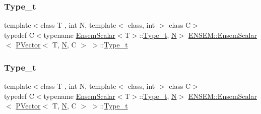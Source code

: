 \subsubsection{\texorpdfstring{Type\_t}{Type\_t}\hspace{0.1cm}{\footnotesize\ttfamily [1/3]}}
{\footnotesize\ttfamily template$<$class T , int N, template$<$ class, int $>$ class C$>$ \\
typedef C$<$typename \mbox{\hyperlink{structENSEM_1_1EnsemScalar}{Ensem\+Scalar}}$<$T$>$\+::\mbox{\hyperlink{structENSEM_1_1EnsemScalar_3_01PVector_3_01T_00_01N_00_01C_01_4_01_4_a7301e4986b6b626a7c41055ad178ffac}{Type\+\_\+t}}, \mbox{\hyperlink{adat__devel_2lib_2hadron_2operator__name__util_8cc_a7722c8ecbb62d99aee7ce68b1752f337}{N}}$>$ \mbox{\hyperlink{structENSEM_1_1EnsemScalar}{E\+N\+S\+E\+M\+::\+Ensem\+Scalar}}$<$ \mbox{\hyperlink{classENSEM_1_1PVector}{P\+Vector}}$<$ T, \mbox{\hyperlink{adat__devel_2lib_2hadron_2operator__name__util_8cc_a7722c8ecbb62d99aee7ce68b1752f337}{N}}, C $>$ $>$\+::\mbox{\hyperlink{structENSEM_1_1EnsemScalar_3_01PVector_3_01T_00_01N_00_01C_01_4_01_4_a7301e4986b6b626a7c41055ad178ffac}{Type\+\_\+t}}}

\mbox{\label{structENSEM_1_1EnsemScalar_3_01PVector_3_01T_00_01N_00_01C_01_4_01_4_a7301e4986b6b626a7c41055ad178ffac}} 
\subsubsection{\texorpdfstring{Type\_t}{Type\_t}\hspace{0.1cm}{\footnotesize\ttfamily [2/3]}}
{\footnotesize\ttfamily template$<$class T , int N, template$<$ class, int $>$ class C$>$ \\
typedef C$<$typename \mbox{\hyperlink{structENSEM_1_1EnsemScalar}{Ensem\+Scalar}}$<$T$>$\+::\mbox{\hyperlink{structENSEM_1_1EnsemScalar_3_01PVector_3_01T_00_01N_00_01C_01_4_01_4_a7301e4986b6b626a7c41055ad178ffac}{Type\+\_\+t}}, \mbox{\hyperlink{adat__devel_2lib_2hadron_2operator__name__util_8cc_a7722c8ecbb62d99aee7ce68b1752f337}{N}}$>$ \mbox{\hyperlink{structENSEM_1_1EnsemScalar}{E\+N\+S\+E\+M\+::\+Ensem\+Scalar}}$<$ \mbox{\hyperlink{classENSEM_1_1PVector}{P\+Vector}}$<$ T, \mbox{\hyperlink{adat__devel_2lib_2hadron_2operator__name__util_8cc_a7722c8ecbb62d99aee7ce68b1752f337}{N}}, C $>$ $>$\+::\mbox{\hyperlink{structENSEM_1_1EnsemScalar_3_01PVector_3_01T_00_01N_00_01C_01_4_01_4_a7301e4986b6b626a7c41055ad178ffac}{Type\+\_\+t}}}

